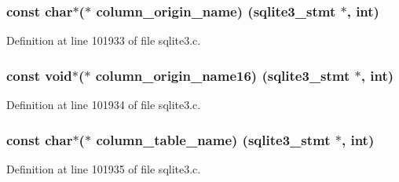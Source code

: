 \subsubsection[{column\+\_\+origin\+\_\+name}]{\setlength{\rightskip}{0pt plus 5cm}const char$\ast$($\ast$ column\+\_\+origin\+\_\+name) ({\bf sqlite3\+\_\+stmt} $\ast$, int)}\label{structsqlite3__api__routines_a73748d4fc1d34e9a147c1781667bd1c8}


Definition at line 101933 of file sqlite3.\+c.

\hypertarget{structsqlite3__api__routines_ad98229e18c6cddc831512179a1695418}{}
\subsubsection[{column\+\_\+origin\+\_\+name16}]{\setlength{\rightskip}{0pt plus 5cm}const void$\ast$($\ast$ column\+\_\+origin\+\_\+name16) ({\bf sqlite3\+\_\+stmt} $\ast$, int)}\label{structsqlite3__api__routines_ad98229e18c6cddc831512179a1695418}


Definition at line 101934 of file sqlite3.\+c.

\hypertarget{structsqlite3__api__routines_a1ea5266d202a57ddaffc1b7951b43305}{}
\subsubsection[{column\+\_\+table\+\_\+name}]{\setlength{\rightskip}{0pt plus 5cm}const char$\ast$($\ast$ column\+\_\+table\+\_\+name) ({\bf sqlite3\+\_\+stmt} $\ast$, int)}\label{structsqlite3__api__routines_a1ea5266d202a57ddaffc1b7951b43305}


Definition at line 101935 of file sqlite3.\+c.

\hypertarget{structsqlite3__api__routines_a5ab49c39dc125f958df10ecc88fd9b12}{}
